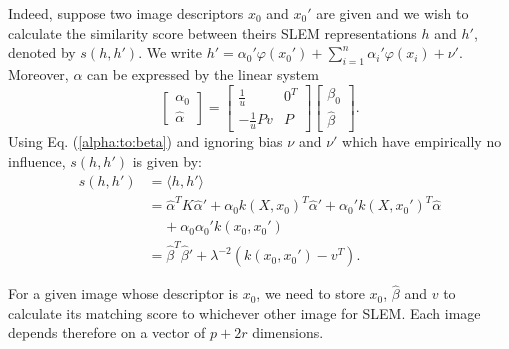 Indeed, suppose two image descriptors $x_0$ and $x_0'$ are given and we wish to calculate the similarity score between theirs SLEM representations $h$ and $h'$, denoted by $s(h,h')$. 
We write $h'=\alpha_0'\varphi(x_0')+\sum_{i=1}^n \alpha_i'\varphi (x_i)+\nu'$. 
Moreover, $\alpha$ can be expressed by the linear system
\begin{equation}
\begin{bmatrix} \alpha_0 \\ \hat{\alpha} \end{bmatrix} = \begin{bmatrix} \frac{1}{u} & 0^T \\-\frac{1}{u}Pv & P  \end{bmatrix} \begin{bmatrix}\beta_0 \\ \hat{\beta} \end{bmatrix}.\label{alpha:to:beta}
\end{equation}
Using Eq. (\ref{alpha:to:beta}) and ignoring bias $\nu$ and $\nu'$ which have empirically no influence, $s(h,h')$ is given by:
\begin{equation}
\begin{split}
s(h,h') & = \langle h, h'\rangle \\
		& = \hat{\alpha}^{T} K\hat{\alpha}'+\alpha_0k(X, x_0)^T\hat{\alpha}'+\alpha_0'k(X, x_0')^T\hat{\alpha} \\
		& \ \ \ \ \ +\alpha_0\alpha_0'k(x_0,x_0')\\
		& = \hat{\beta}^T\hat{\beta}'+\lambda^{-2}(k(x_0,x_0')-v^T).
\end{split}
\end{equation}

For a given image whose descriptor is $x_0$, we need to store $x_0$, $\hat{\beta}$ and $v$ to calculate its matching score to whichever other image for SLEM. Each image depends therefore on a vector of $p+2r$ dimensions.

